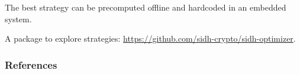 \documentclass{beamer}
\begin{document}
\begin{frame}
  The best strategy can be \alert{precomputed} offline and
  \alert{hardcoded} in an embedded system.

  \begin{block}{}
    A package to explore strategies: \url{https://github.com/sidh-crypto/sidh-optimizer}.
  \end{block}
\end{frame}


\begin{frame}[allowframebreaks]
  \frametitle{References}


  \beamertemplatebookbibitems
  \printbibliography[filter=books]
  \beamertemplatearticlebibitems
  \printbibliography[filter=articles]
\end{frame}
\end{document}
